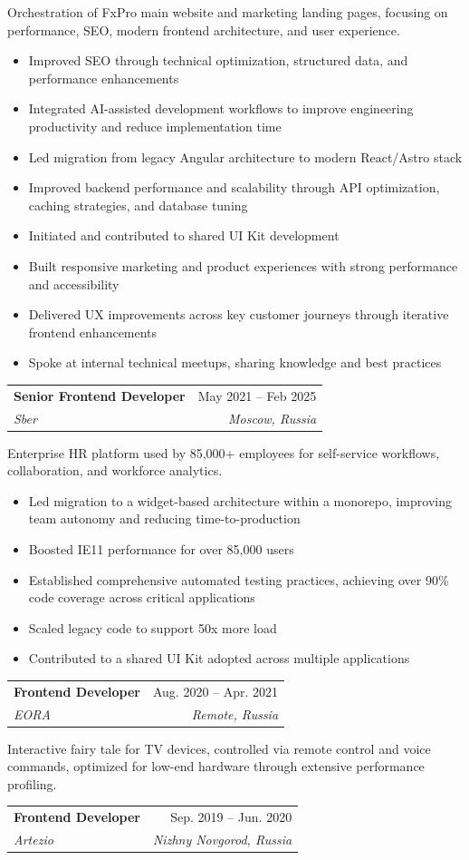 \documentclass[letterpaper,11pt]{article}
\makeatletter
\newcommand{\resumeItem}[1]{
  \item\small{
    \begin{minipage}[t]{0.99\linewidth} %
      {#1}
    \end{minipage}
    \vspace{-2pt} %
  }
}
\newcommand{\resumeSubheading}[4]{
  \vspace{-2pt}\item
    \begin{tabular*}{0.97\textwidth}[t]{l@{\extracolsep{\fill}}r}
      \textbf{#1} & #2 \\
      \textit{\small#3} & \textit{\small #4} \\
    \end{tabular*}\vspace{-7pt}
}
\newcommand{\projectDescription}[1]{
    \vspace{8pt} %
    \small {#1}
    \vspace{-6pt} %
}
\newcommand{\resumeItemListStart}{\begin{itemize}}
\newcommand{\resumeItemListEnd}{\end{itemize}\vspace{-5pt}}
\makeatother
\begin{document}
    \projectDescription
  {Orchestration of FxPro main website and marketing landing pages, focusing on performance, SEO, modern frontend architecture, and user experience.}
  
    \resumeItemListStart
      \resumeItem{Improved SEO through technical optimization, structured data, and performance enhancements}
      \resumeItem{Integrated AI-assisted development workflows to improve engineering productivity and reduce implementation time}
      \resumeItem{Led migration from legacy Angular architecture to modern React/Astro stack}
      \resumeItem{Improved backend performance and scalability through API optimization, caching strategies, and database tuning}
      \resumeItem{Initiated and contributed to shared UI Kit development}
      \resumeItem{Built responsive marketing and product experiences with strong performance and accessibility}
      \resumeItem{Delivered UX improvements across key customer journeys through iterative frontend enhancements}
      \resumeItem{Spoke at internal technical meetups, sharing knowledge and best practices}
    \resumeItemListEnd

    \resumeSubheading
      {Senior Frontend Developer}{May 2021 -- Feb 2025}
      {Sber}{Moscow, Russia}

    \projectDescription
      {Enterprise HR platform used by 85,000+ employees for self-service workflows, collaboration, and workforce analytics.}
        
      \resumeItemListStart
        \resumeItem{Led migration to a widget-based architecture within a monorepo, improving team autonomy and reducing time-to-production}
        \resumeItem{Boosted IE11 performance for over 85,000 users}
        \resumeItem{Established comprehensive automated testing practices, achieving over 90\% code coverage across critical applications}
        \resumeItem{Scaled legacy code to support 50x more load}
        \resumeItem{Contributed to a shared UI Kit adopted across multiple applications}
      \resumeItemListEnd

    \resumeSubheading
      {Frontend Developer}{Aug. 2020 -- Apr. 2021}
      {EORA}{Remote, Russia}

    \projectDescription
      {Interactive fairy tale for TV devices, controlled via remote control and voice commands, optimized for low-end hardware through extensive performance profiling.}
    \vspace{6pt} %
    
    \resumeSubheading
    {Frontend Developer}{Sep. 2019 -- Jun. 2020}
    {Artezio}{Nizhny Novgorod, Russia}
    
\end{document}
